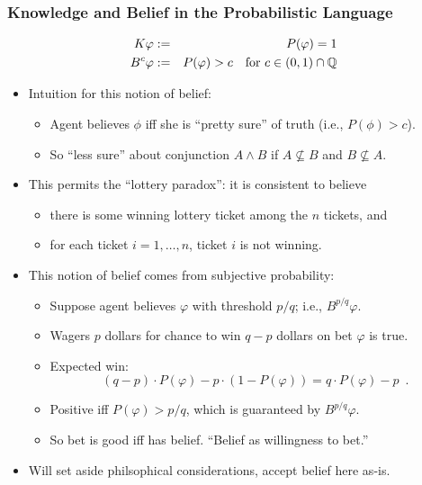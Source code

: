 \begin{frame}
  \frametitle{Knowledge and Belief in the Probabilistic Language}
  \vspace{-2em}
  \begin{eqnarray*}
    K\varphi &:=& P(\varphi)=1
    \\
    B^c\varphi &:=& P(\varphi)>c 
    \quad \text{for } c\in(0,1)\cap\mathbb{Q}
  \end{eqnarray*}
  \vspace{-2em}
  \begin{itemize}
  \item<+-> Intuition for this notion of belief:
    \begin{itemize}
    \item Agent believes $\phi$ iff she is ``pretty sure'' of truth
      (i.e., $P(\phi)>c$).

    \item So ``less sure'' about conjunction $A\land B$ if
      $A\nsubseteq B$ and $B\nsubseteq A$.
    \end{itemize}
    
  \item<+-> This permits the ``lottery paradox'': it is consistent to
    believe
    \begin{itemize}
    \item there is some winning lottery ticket among the $n$ tickets,
      and

    \item for each ticket $i=1,\ldots,n$, ticket $i$ is not winning.
    \end{itemize}

  \item<+-> This notion of belief comes from subjective probability:
    \begin{itemize}
    \item Suppose agent believes $\varphi$ with threshold $p/q$; i.e.,
      $B^{p/q}\varphi$.

    \item Wagers $p$ dollars for chance to win $q-p$ dollars on bet
      $\varphi$ is true.

    \item Expected win:
      \vspace{-1em}
      \[
      (q-p)\cdot P(\varphi) - p\cdot(1-P(\varphi)) = q\cdot P(\varphi) -
      p\enspace.
      \]
      \vspace{-1em}
      
    \item Positive iff $P(\varphi)>p/q$, which is guaranteed by
      $B^{p/q}\varphi$.

    \item So bet is good iff has belief.
      ``Belief as willingness to bet.''
    \end{itemize}

  \item<+-> Will set aside philsophical considerations, accept
    belief here as-is.
  \end{itemize}
\end{frame}


